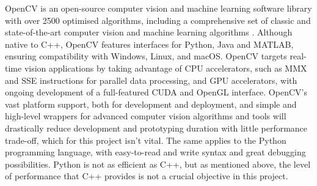 OpenCV is an open-source computer vision and machine learning software library with over 2500 optimised algorithms, including a comprehensive set of classic and state-of-the-art computer vision and machine learning algorithms \cite{opencv}. Although native to C++, OpenCV features interfaces for Python, Java and MATLAB, ensuring compatibility with Windows, Linux, and macOS. OpenCV targets real-time vision applications by taking advantage of CPU accelerators, such as MMX and SSE instructions for parallel data processing, and GPU accelerators, with ongoing development of a full-featured CUDA and OpenGL interface. OpenCV's vast platform support, both for development and deployment, and simple and high-level wrappers for advanced computer vision algorithms and tools will drastically reduce development and prototyping duration with little performance trade-off, which for this project isn't vital. The same applies to the Python programming language, with easy-to-read and write syntax and great debugging possibilities. Python is not as efficient as C++, but as mentioned above, the level of performance that C++ provides is not a crucial objective in this project.
